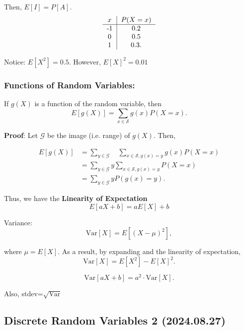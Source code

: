 \documentclass[12pt]{article}
\begin{document}
Then, $E[I] = P[A]$.
\[
\begin{tabular}{c | c}
$x$ & $P(X = x)$ \\
\hline
-1 & 0.2 \\ 
0 & 0.5 \\
1 & 0.3.
\end{tabular}\]

Notice: $E[X^2] = 0.5.$
However, $E[X]^2 = 0.01$

\subsubsection{Functions of Random Variables:} 
If $g(X)$ is a function of the random variable, then
\[E[g(X)] = \sum_{x \in \mathcal{S}} g(x) P(X=x).\]

\textbf{Proof}:
Let $\mathcal{G}$ be the image (i.e. range) of $g(X)$.
Then,

\begin{align*}E[g(X)] &= \sum_{y \in \mathcal{G}} \quad \sum_{x \in \mathcal{S}, g(x)=y}g(x)P(X=x)\\
&=\sum_{y \in \mathcal{G}} y \sum_{x \in \mathcal{S}, g(x)=y}P(X=x)\\
&=\sum_{y\in \mathcal{G}}yP(g(x)=y).\end{align*}


Thus, we have the \textbf{Linearity of Expectation}
\[E[aX+b] = aE[X]+b\]

Variance:
\[\text{Var}[X] = E\left[(X-\mu)^2\right],\]

where $\mu = E[X].$ As a result, by expanding and the linearity of expectation,
\[\text{Var}[X]=E[X^2]-E[X]^2.\]

\[\text{Var}[aX+b] = a^2\cdot\text{Var}[X].\]

Also, stdev=$\sqrt{\text{Var}}$


\subsection{Discrete Random Variables 2 (2024.08.27)}
\end{document}
